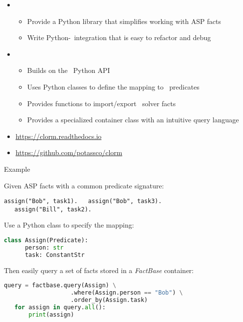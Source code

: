 \begin{frame}{\clorm}
  \begin{itemize}
  \item {} \
    \begin{itemize}
    \item Provide a Python library that simplifies working with ASP facts
    \item Write Python-\clingo\ integration that is easy to refactor and debug
      \end{itemize}
  \item {} \
    \begin{itemize}
    \item Builds on the \clingo\ Python API
    \item Uses Python classes to define the mapping to \clingo\ predicates
    \item Provides functions to import/export \clingo\ solver facts
    \item Provides a specialized container class with an intuitive query language
    \end{itemize}
  \item \structure{Documentation} \url{https://clorm.readthedocs.io}
  \item {} \url{https://github.com/potassco/clorm}
  \end{itemize}
\end{frame}


\begin{frame}[fragile]{Example}

  Given ASP facts with a common predicate signature:

\begin{lstlisting}[language=clingo,basicstyle=\small\ttfamily]
   assign("Bob", task1).   assign("Bob", task3).
   assign("Bill", task2).
\end{lstlisting}

  Use a Python class to specify the mapping:

\begin{lstlisting}[language=Python, basicstyle=\small\ttfamily]
   class Assign(Predicate):
      person: str
      task: ConstantStr
\end{lstlisting}

Then easily query a set of facts stored in a \emph{FactBase} container:

\begin{lstlisting}[language=Python, basicstyle=\small\ttfamily]
   query = factbase.query(Assign) \
                   .where(Assign.person == "Bob") \
                   .order_by(Assign.task)
   for assign in query.all():
       print(assign)
\end{lstlisting}

\end{frame}
%
